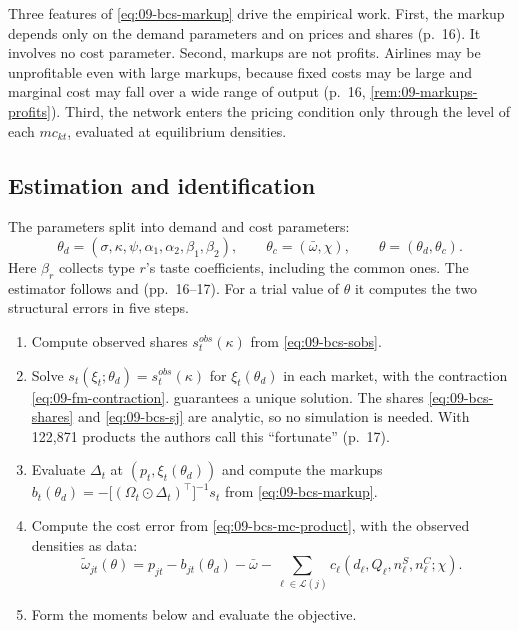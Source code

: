 Three features of \eqref{eq:09-bcs-markup} drive the empirical work. First, the markup depends only on the
demand parameters and on prices and shares (p.~16). It involves no cost parameter. Second, markups are not
profits. Airlines may be unprofitable even with large markups, because fixed costs may be large and marginal
cost may fall over a wide range of output (p.~16, \cref{rem:09-markups-profits}). Third, the network enters
the pricing condition only through the level of each $mc_{kt}$, evaluated at equilibrium densities.

\subsection{Estimation and identification}\label{sec:09-bcs-estimation}

The parameters split into demand and cost parameters:
\begin{equation*}
\theta_d=(\sigma,\kappa,\psi,\alpha_1,\alpha_2,\beta_1,\beta_2),\qquad
\theta_c=(\bar\omega,\chi),\qquad \theta=(\theta_d,\theta_c).
\end{equation*}
Here $\beta_r$ collects type $r$'s taste coefficients, including the common
ones. The estimator follows \citet{Berry1994} and \citet{BerryLevinsohnPakes1995} (pp.~16--17). For a trial
value of $\theta$ it computes the two structural errors in five steps.
\begin{enumerate}[label=\arabic*.]
  \item Compute observed shares $s^{obs}_t(\kappa)$ from \eqref{eq:09-bcs-sobs}.
  \item Solve $s_t(\xi_t;\theta_d)=s^{obs}_t(\kappa)$ for $\xi_t(\theta_d)$ in each market, with the
  contraction \eqref{eq:09-fm-contraction}. \citet{Berry1994} guarantees a unique solution. The shares
  \eqref{eq:09-bcs-shares} and \eqref{eq:09-bcs-sj} are analytic, so no simulation is needed. With
  122,871 products the authors call this ``fortunate'' (p.~17).
  \item Evaluate $\Delta_t$ at $(p_t,\xi_t(\theta_d))$ and compute the markups
  $b_t(\theta_d)=-\big[(\Omega_t\odot\Delta_t)^\top\big]^{-1}s_t$ from \eqref{eq:09-bcs-markup}.
  \item Compute the cost error from \eqref{eq:09-bcs-mc-product}, with the observed densities as data:
  \begin{equation}\label{eq:09-bcs-omega}
  \tilde\omega_{jt}(\theta)=p_{jt}-b_{jt}(\theta_d)-\bar\omega-\sum_{\ell\in\mathcal{L}(j)}c_\ell(d_\ell,Q_\ell,n^S_\ell,n^C_\ell;\chi).
  \end{equation}
  \item Form the moments below and evaluate the objective.
\end{enumerate}
